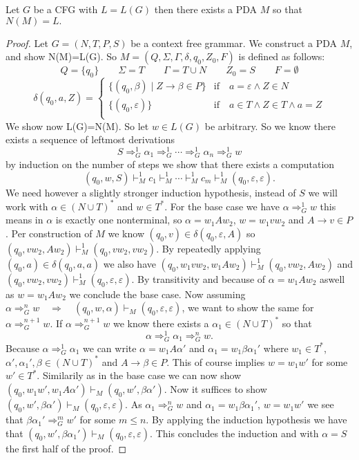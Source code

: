 \begin{theorem}\label{thm:PDA_of_CFG}
  Let $G$ be a CFG with $L=L(G)$ then there exists a PDA $M$ so that $N(M)=L.$
\end{theorem}
\begin{proof}
  Let $G=(N,T,P,S)$ be a context free grammar. We construct a PDA $M$, and show
  N(M)=L(G). So $M=(Q,\Sigma,\Gamma,\delta,q_0,Z_0,F)$ is defined as follows:
  \[
    Q=\{q_0\} \qquad \Sigma = T \qquad \Gamma = T \cup N \qquad Z_0=S  \qquad F=\emptyset
  \]
  \[
    \delta(q_0,a,Z) =  \begin{cases}
      \{(q_0,\beta)\mid  Z\to\beta\in P\} & \text{if} \quad a=\varepsilon \land Z\in N \\
      \{(q_0,\varepsilon)\} & \text{if} \quad a\in T \land Z\in T \land a=Z \\
    \end{cases}
  \]
  We show now L(G)=N(M). So let $w\in L(G)$ be arbitrary. So we know there exists a sequence
  of leftmost derivations
  \[
    S \Rightarrow_G^1 \alpha_1 \Rightarrow_G^1 \cdots \Rightarrow_G^1 \alpha_n \Rightarrow_G^1 w
  \]
  by induction on the number of steps we show that there exists a computation
  \[
    (q_0,w,S) \vdash_M^1 c_1 \vdash_M^1 \cdots \vdash_M^1 c_m \vdash_M^1
    (q_0,\varepsilon,\varepsilon).
  \]
  We need however a slightly stronger induction hypothesis, instead of $S$ we will work
  with $\alpha \in (N\cup T)^*$ and $w \in T^*$.
  For the base case we have $\alpha \Rightarrow_G^1 w$ this means in $\alpha$ is exactly one
  nonterminal, so $\alpha=w_1Aw_2$, $w=w_1vw_2$ and  $A\to v\in P$.
  Per construction of $M$ we know $(q_0,v)\in\delta(q_0,\varepsilon,A)$ so
  $(q_0,vw_2,Aw_2)\vdash_M^1(q_0,vw_2,vw_2)$. By repeatedly applying $(q_0,a)\in\delta(q_0,a,a)$
  we also have $(q_0,w_1vw_2,w_1Aw_2)\vdash_M^1(q_0,vw_2,Aw_2)$ and
  $(q_0,vw_2,vw_2)\vdash_M^1(q_0,\varepsilon,\varepsilon)$. By transitivity and because of
  $\alpha = w_1Aw_2$ aswell as $w=w_1Aw_2$ we conclude the base case.
  Now assuming  $\alpha \Rightarrow_G^n w \quad\Longrightarrow \quad(q_0,w,\alpha)\vdash_M
  (q_0,\varepsilon,\varepsilon)$, we want to show the same for  $\alpha \Rightarrow_G^{n+1} w$.
  If $\alpha \Rightarrow_G^{n+1} w$ we know there exists a $\alpha_1 \in  (N\cup T)^*$ so that
  \[
    \alpha \Rightarrow_G^1 \alpha_1 \Rightarrow_G^n w.
  \]
  Because $\alpha \Rightarrow_G^1 \alpha_1$
  we can write $\alpha = w_1A\alpha'$ and  $\alpha_1 = w_1\beta\alpha_1'$ where $w_1\in T^*$,
  $\alpha',\alpha_1',\beta\in (N\cup T)^*$ and $A\to\beta \in P.$  This of course implies
  $w=w_1w'$ for some $w'\in T^*$.
  Similarily as in the base case
  we can now show $(q_0,w_1w',w_1A\alpha')\vdash_M(q_0,w',\beta\alpha')$. Now it suffices to show
  $(q_0,w',\beta\alpha')\vdash_M(q_0,\varepsilon,\varepsilon)$. As  $\alpha_1 \Rightarrow_G^n w$
  and $\alpha_1 = w_1\beta\alpha_1'$, $w=w_1w'$ we see that $\beta\alpha_1'\Rightarrow_G^m w'$ for some
  $m\le n$. By applying the induction hypothesis we have that $(q_0,w',\beta\alpha_1')\vdash_M(q_0,\varepsilon,\varepsilon)$.
  This concludes the induction and with $\alpha=S$ the first half of the proof.


\end{proof}
